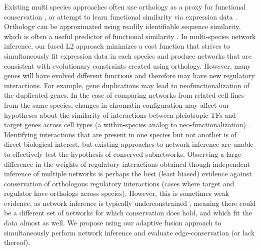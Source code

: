 \documentclass[11pt]{article}
\begin{document}
Existing multi species approaches often use orthology as a proxy for functional conservation \cite{roy_arboretum:_2013, penfold_inferring_2015, joshi_multi-species_2015, kashima_simultaneous_2009, zhang2010nearly}, or attempt to learn functional similarity via expression data \cite{gholami_cross-species_2010}. 
Orthology can be approximated using readily identifiable sequence similarity, which is often a useful predictor of functional similarity \cite{wilson_assessing_2000, jensen_eggnog:_2008}. 
In multi-species network inference, our fused L2 approach minimizes a cost function that strives to simultaneously fit expression data in each species and produce networks that are consistent with evolutionary constraints created using orthology. 
However, many genes will have evolved different functions and therefore may have new regulatory interactions. 
For example, gene duplications may lead to neofunctionalization \cite{eisen_phylogenomics:_1998} of the duplicated genes. 
In the case of comparing networks from related cell lines from the same species, changes in chromatin configuration may affect our hypotheses about the similarity of interactions between pleiotropic TFs and target genes across cell types (a within-species analog to neo-functionalization) \cite{li_role_2007}.
Identifying interactions that are present in one species but not another is of direct biological interest, but existing approaches to network inference are unable to effectively test the hypothesis of conserved subnetworks. 
Observing a large difference in the weights of regulatory interactions obtained though independent inference of multiple networks is perhaps the best (least biased) evidence against conservation of orthologous regulatory interactions (cases where target and regulator have orthologs across species). 
However, this is sometimes weak evidence, as network inference is typically underconstrained \cite{marbach_revealing_2010}, meaning there could be a different set of networks for which conservation does hold, and which fit the data almost as well. 
We propose using our adaptive fusion approach to simultaneously perform network inference and evaluate edge-conservation (or lack thereof). 
\end{document}
